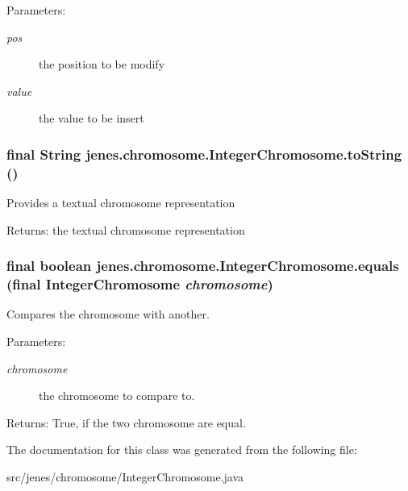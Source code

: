 \begin{Desc}
\item[Parameters:]
\begin{description}
\item[{\em pos}]the position to be modify \item[{\em value}]the value to be insert \end{description}
\end{Desc}
\hypertarget{classjenes_1_1chromosome_1_1_integer_chromosome_ac7f634cd0b9449d2db45a87a0773ba3}{
\subsubsection[toString]{\setlength{\rightskip}{0pt plus 5cm}final String jenes.chromosome.IntegerChromosome.toString ()}}
\label{classjenes_1_1chromosome_1_1_integer_chromosome_ac7f634cd0b9449d2db45a87a0773ba3}


Provides a textual chromosome representation \begin{Desc}
\item[Returns:]the textual chromosome representation \end{Desc}
\hypertarget{classjenes_1_1chromosome_1_1_integer_chromosome_58904190bf6c0d3f3b34dd584dab91b7}{
\subsubsection[equals]{\setlength{\rightskip}{0pt plus 5cm}final boolean jenes.chromosome.IntegerChromosome.equals (final {\bf IntegerChromosome} {\em chromosome})}}
\label{classjenes_1_1chromosome_1_1_integer_chromosome_58904190bf6c0d3f3b34dd584dab91b7}


Compares the chromosome with another.

\begin{Desc}
\item[Parameters:]
\begin{description}
\item[{\em chromosome}]the chromosome to compare to. \end{description}
\end{Desc}
\begin{Desc}
\item[Returns:]True, if the two chromosome are equal. \end{Desc}


The documentation for this class was generated from the following file:\begin{CompactItemize}
\item 
src/jenes/chromosome/IntegerChromosome.java\end{CompactItemize}
